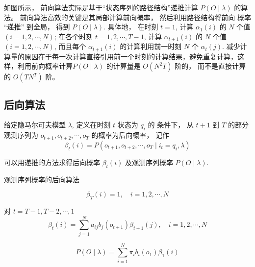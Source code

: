 如图所示， 前向算法实际是基于“状态序列的路径结构”递推计算 $ P(O \mid \lambda) $ 的算法。 前向算法高效的关键是其局部计算前向概率， 然后利用路径结构将前向 概率 “递推” 到全局， 得到 $ P(O \mid \lambda) $. 具体地， 在时刻 $ t=1 $, 计算 $ \alpha_{1}(i) $ 的 $ N $ 个值$ (i=1,2, \cdots, N) $; 在各个时刻 $ t=1,2, \cdots, T-1 $, 计算 $ \alpha_{t+1}(i) $ 的 $ N $ 个值 $ (i=1,2, \cdots, N) $, 而且每个 $ \alpha_{t+1}(i) $ 的计算利用前一时刻 $ N $ 个 $ \alpha_{t}(j) $. 减少计算量的原因在于每一次计算直接引用前一个时刻的计算结果，避免重复计算，这样，利用前向概率计算$ P(O \mid \lambda) $ 的计算量是 $ O\left(N^{2} T\right) $ 阶的， 而不是直接计算的 $ O\left(T N^{T}\right) $ 阶。

\subsection{后向算法}

\begin{definition}[后向概率]
    给定隐马尔可夫模型 $\lambda$, 定义在时刻 $t$ 状态为 $q_{i}$ 的 条件下， 从 $t+1$ 到 $T$ 的部分观测序列为 $o_{t+1}, o_{t+2}, \cdots, o_{T}$ 的概率为后向概率， 记作
\begin{equation}
\beta_{t}(i)=P\left(o_{t+1}, o_{t+2}, \cdots, o_{T} \mid i_{t}=q_{i}, \lambda\right)
\end{equation}

\end{definition}

可以用递推的方法求得后向概率 $\beta_{t}(i)$ 及观测序列概率 $P(O \mid \lambda)$.

\begin{algorithm}[htbp]
    \caption{观测序列概率的后向算法}

    \begin{equation} \beta_{T}(i)=1, \quad i=1,2, \cdots, N \end{equation}\;

    对   $ t=T-1, T-2, \cdots, 1 $
    \begin{equation} \beta_{t}(i)=\sum_{j=1}^{N} a_{i j} b_{j}\left(o_{t+1}\right) \beta_{t+1}(j), \quad i=1,2, \cdots, N \end{equation}\;

    \begin{equation} P(O \mid \lambda)=\sum_{i=1}^{N} \pi_{i} b_{i}\left(o_{1}\right) \beta_{1}(i) \end{equation}\;
\end{algorithm}

